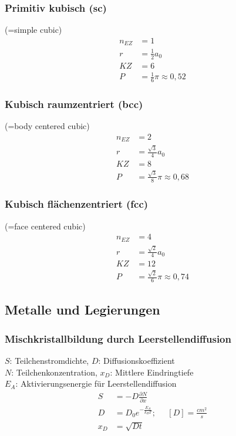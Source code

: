 \documentclass[a4paper,twocolumn,10pt]{article}
\begin{document}
\subsubsection{Primitiv kubisch (sc)}
(=simple cubic)
\begin{equation*}
\begin{split}
n_{EZ}&=1\\
r&=\frac{1}{2}a_0\\
KZ&=6\\
P&=\frac{1}{6}\pi\approx 0,52
\end{split}
\end{equation*}

\subsubsection{Kubisch raumzentriert (bcc)}
(=body centered cubic)
\begin{equation*}
\begin{split}
n_{EZ}&=2\\
r&=\frac{\sqrt{3}}{4}a_0\\
KZ&=8\\
P&=\frac{\sqrt{3}}{8}\pi\approx 0,68
\end{split}
\end{equation*}

\subsubsection{Kubisch flächenzentriert (fcc)}
(=face centered cubic)
\begin{equation*}
\begin{split}
n_{EZ}&=4\\
r&=\frac{\sqrt{2}}{4}a_0\\
KZ&=12\\
P&=\frac{\sqrt{2}}{6}\pi\approx 0,74
\end{split}
\end{equation*}

\subsection{Metalle und Legierungen}

\subsubsection{Mischkristallbildung durch Leerstellendiffusion}
$S$: Teilchenstromdichte, $D$: Diffusionskoeffizient\\
$N$: Teilchenkonzentration, $x_D$: Mittlere Eindringtiefe\\
$E_A$: Aktivierungsenergie für Leerstellendiffusion
\begin{equation*}
\begin{split}
S&=-D\frac{\partial N}{\partial x}\\
D&=D_0e^{-\frac{E_A}{k_BT}};\;\;\;\;\;[D]=\frac{cm^2}{s}\\
x_D&=\sqrt{Dt}
\end{split}
\end{equation*}
\end{document}
